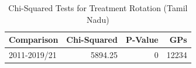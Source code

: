 \begin{table}[!h]
\centering
\caption{\label{tab:chi_sq_uk}Chi-Squared Tests for Treatment Rotation (Tamil Nadu)}
\centering
\fontsize{8}{10}\selectfont
\begin{tabular}[t]{lrrr}
\toprule
Comparison & Chi-Squared & P-Value & GPs\\
\midrule
2011-2019/21 & 5894.25 & 0 & 12234\\
\bottomrule
\end{tabular}
\end{table}
